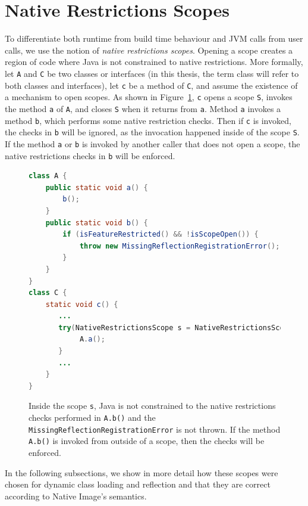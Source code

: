 \section{Native Restrictions Scopes}
To differentiate both runtime from build time behaviour and JVM calls from user calls, we use the notion of \emph{native restrictions scopes}. Opening a scope creates a region of code where Java is not constrained to native restrictions. 
More formally, let \verb|A| and \verb|C| be two classes or interfaces (in this thesis, the term class will refer to both classes and interfaces), let \verb|c| be a method of \verb|C|, and assume the existence of a mechanism to open scopes. As shown in Figure~\ref{fig:scopes}, \verb|c| opens a scope \verb|S|, invokes the method \verb|a| of \verb|A|, and closes \verb|S| when it returns from \verb|a|. Method \verb|a| invokes a method \verb|b|, which performs some native restriction checks.
Then if \verb|c| is invoked, the checks in \verb|b| will be ignored, as the invocation happened inside of the scope \verb|S|.
If the method \verb|a| or \verb|b| is invoked by another caller that does not open a scope, the native restrictions checks in \verb|b| will be enforced.

\begin{figure}[ht]
    \centering
\begin{lstlisting}[language=Java]
class A {
    public static void a() {
        b(); 
    }
    public static void b() {
        if (isFeatureRestricted() && !isScopeOpen()) {
            throw new MissingReflectionRegistrationError();
        }
    }
} 
class C {
    static void c() {
       ...
       try(NativeRestrictionsScope s = NativeRestrictionsScope.openScope()) {
            A.a();
       }
       ...
    }
}
\end{lstlisting}
    \caption{Inside the scope \texttt{s}, Java is not constrained to the native restrictions checks performed in \texttt{A.b()} and the \texttt{MissingReflectionRegistrationError} is not thrown. If the method \texttt{A.b()} is invoked from outside of a scope, then the checks will be enforced.}
    \label{fig:scopes}
\end{figure}

In the following subsections, we show in more detail how these scopes were chosen for dynamic class loading and reflection and that they are correct according to Native Image's semantics.

